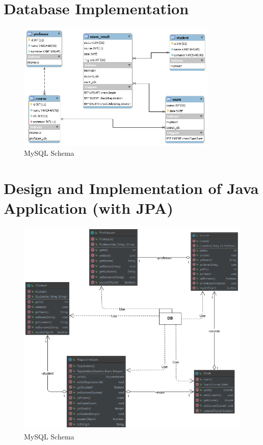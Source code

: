 \documentclass{report}
\begin{document}
\section*{Database Implementation}
\begin{figure}[ht]
	\includegraphics[width=0.85\textwidth]{mysqlSchema.png}
	\caption{MySQL Schema}
\end{figure}

\section*{Design and Implementation of Java Application (with JPA)}
\begin{figure}[ht]
	\includegraphics[width=1\textwidth]{Jpa_leveldb_Diagram.png}
	\caption{MySQL Schema}
\end{figure}
\end{document}
